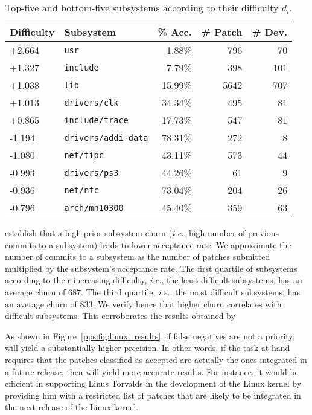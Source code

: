 \begin{table}
	\caption{Top-five and bottom-five subsystems according to their difficulty $d_i$.}
	\label{pps:tab:linux_subsystems}
	\begin{tabular}{llrrr}
		\toprule
		Difficulty & Subsystem                  & \% Acc. & \# Patch & \# Dev. \\
		\midrule
		+2.664     & \texttt{usr}               & 1.88\%  & 796      & 70      \\
		+1.327     & \texttt{include}           & 7.79\%  & 398      & 101     \\
		+1.038     & \texttt{lib}               & 15.99\% & 5642     & 707     \\
		+1.013     & \texttt{drivers/clk}       & 34.34\% & 495      & 81      \\
		+0.865     & \texttt{include/trace}     & 17.73\% & 547      & 81      \\
		\midrule
		-1.194     & \texttt{drivers/addi-data} & 78.31\% & 272      & 8       \\
		-1.080     & \texttt{net/tipc}          & 43.11\% & 573      & 44      \\
		-0.993     & \texttt{drivers/ps3}       & 44.26\% & 61       & 9       \\
		-0.936     & \texttt{net/nfc}           & 73.04\% & 204      & 26      \\
		-0.796     & \texttt{arch/mn10300}      & 45.40\% & 359      & 63      \\
		\bottomrule
	\end{tabular}
\end{table}

\citet{jiang2013will} establish that a high prior subsystem churn (\textit{i.e.}, high number of previous commits to a subsystem) leads to lower acceptance rate.
We approximate the number of commits to a subsystem as the number of patches submitted multiplied by the subsystem's acceptance rate.
The first quartile of subsystems according to their increasing difficulty, \textit{i.e.}, the least difficult subsystems, has an average churn of \num{687}.
The third quartile, \textit{i.e.}, the most difficult subsystems, has an average churn of \num{833}.
We verify hence that higher churn correlates with difficult subsystems.
This corroborates the results obtained by \citeauthor{jiang2013will}

As shown in Figure~\ref{pps:fig:linux_results}, if false negatives are not a priority, \interank{} will yield a substantially higher precision.
In other words, if the task at hand requires that the patches classified as accepted are actually the ones integrated in a future release, then \interank{} will yield more accurate results.
For instance, it would be efficient in supporting Linus Torvalds in the development of the Linux kernel by providing him with a restricted list of patches that are likely to be integrated in the next release of the Linux kernel.
